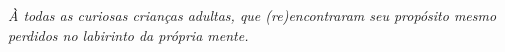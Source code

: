 \documentclass[
	12pt,		%
	a4paper,	%
	openright,  %
	oneside,	%
	chapter=TITLE,		%
	section=TITLE,		%
	english,	%
	brazilian   %
]{abntex2}
\begin{document}
%
\begin{dedicatoria}
	\vspace*{\fill}
	\begin{flushright}

		\textit{À todas as curiosas crianças adultas, que (re)encontraram seu propósito mesmo perdidos no labirinto da
		própria mente.}





	\end{flushright}
	\vspace*{1cm}
\end{dedicatoria}
\end{document}
